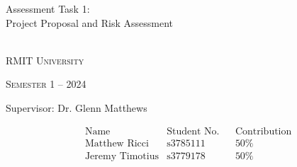 \documentclass[a4paper, oneside]{memoir}
\newcommand*{\semester}[2]{Semester #1 -- #2} %
\newcommand*{\student}[3]{&\text{#1} &\text{#2} &&\text{#3}} %
\newcommand*{\titleAM}[4]%
{\begingroup
  \centering
  {\Huge Assessment Task #2:\\#3\par}\\[\baselineskip]
  {\small\scshape RMIT University}\par
  {\small\scshape #4}\par\vspace{0.5em}
  {\large Supervisor: #1}\par\vspace{0.5em}
  \endgroup}
\begin{document}
  \titleAM{Dr. Glenn Matthews}{1}{Project Proposal and Risk Assessment}{\semester{1}{2024}}
  \begin{align*}
    &\text{Name} &\text{Student No.} &&\text{Contribution}\\
    \student{Matthew Ricci}{s3785111}{50\%}\\
    \student{Jeremy Timotius}{s3779178}{50\%}
  \end{align*}
  \tableofcontents*
  \clearpage

  \markboth{}{}
  
  

  
  
\end{document}
